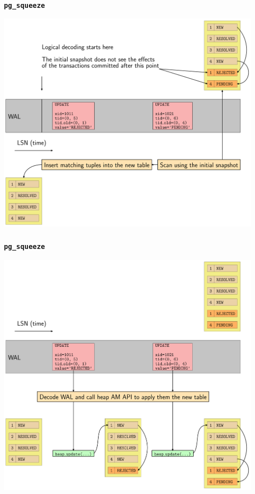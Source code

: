 \begin{frame}
  \frametitle{\texttt{pg\_squeeze}}
  \begin{center}
    \includegraphics[height=\sizeforimages\textheight]{images/pg_squeeze_02.png}
  \end{center}
\end{frame}

\begin{frame}
  \frametitle{\texttt{pg\_squeeze}}
  \begin{center}
    \includegraphics[height=\sizeforimages\textheight]{images/pg_squeeze_03.png}
  \end{center}
\end{frame}

